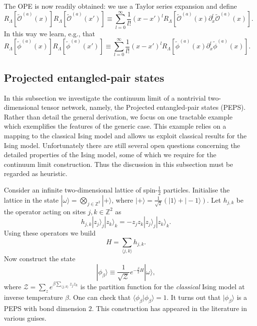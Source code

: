 \documentclass[prl,twocolumn,lengthcheck,superscriptaddress]{revtex4-1}
\theoremstyle{definition}
\theoremstyle{remark}
\begin{document}
 The OPE is now readily obtained: we use a Taylor series expansion and define
 \begin{equation}
 	R_{\Lambda}[\widetilde{\mathcal{O}}^{(a)}(x)]R_{\Lambda}[\widetilde{\mathcal{O}}^{(a)}(x')] \equiv \sum_{l=0}^\infty \frac{1}{l!}(x-x')^l R_{\Lambda}[\widetilde{\mathcal{O}}^{(a)}(x) \partial_x^l\widetilde{\mathcal{O}}^{(a)}(x)].
\end{equation}
In this way we learn, e.g., that
\begin{equation}
 	R_{\Lambda}[\widetilde{\phi}^{(a)}(x)]R_{\Lambda}[\widetilde{\phi}^{(a)}(x')] \equiv \sum_{l=0}^\infty \frac{1}{l!}(x-x')^l R_{\Lambda}[\widetilde{\phi}^{(a)}(x) \partial_x^l\widetilde{\phi}^{(a)}(x)].
 \end{equation}
 

\subsection{Projected entangled-pair states}
In this subsection we investigate the continuum limit of a nontrivial two-dimensional tensor network, namely, the Projected entangled-pair states (PEPS). Rather than detail the general derivation, we focus on one tractable example \cite{verstraete:2006a} which exemplifies the features of the generic case. This example relies on a mapping to the classical Ising model and allows us exploit classical results for the Ising model. Unfortunately there are still several open questions concerning the detailed properties of the Ising model, some of which we require for the continuum limit construction. Thus the discussion in this subsection must be regarded as heuristic.

Consider an infinite two-dimensional lattice of spin-$\frac12$ particles. Initialise the lattice in the state $|\omega\rangle = \bigotimes_{j\in \mathbb{Z}^2} |+\rangle$, where $|+\rangle = \frac{1}{\sqrt{2}}(|1\rangle + |-1\rangle)$. Let $h_{j,k}$ be the operator acting on sites $j, k\in \mathbb{Z}^2$ as 
\begin{equation}
	h_{j,k}|z_j\rangle_j|z_k\rangle_k = -z_jz_k|z_j\rangle_j|z_k\rangle_k.
\end{equation}
Using these operators we build 
\begin{equation}
	H = \sum_{\langle j, k\rangle} h_{j,k}.
\end{equation}
Now construct the state
\begin{equation}
	|\phi_{\beta}\rangle \equiv \frac{1}{\sqrt{\mathcal{Z}}} e^{-\frac{\beta}{2} H} |\omega\rangle,
\end{equation}
where $\mathcal{Z} = \sum_{z} e^{\beta \sum_{\langle j, k\rangle} z_jz_k}$ is the partition function for the \emph{classical} Ising model at inverse temperature $\beta$. One can check that $\langle \phi_\beta|\phi_\beta\rangle = 1$. It turns out \cite{verstraete:2006a} that $|\phi_\beta\rangle$ is a PEPS with bond dimension $2$. This construction has appeared in the literature in various guises.
\end{document}

